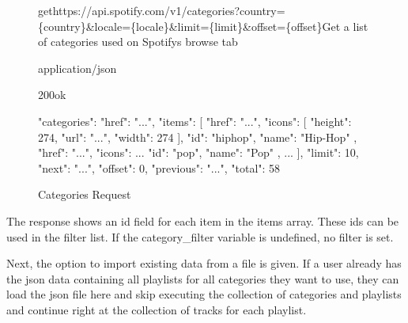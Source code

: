 \begin{figure}[H]
    \caption{Categories Request}
	\label{fig:Categories Request}
\begin{apiRoute}{get}{https://api.spotify.com/v1/categories?country=\{country\}\&locale=\{locale\}\&limit=\{limit\}\&offset=\{offset\}}{Get a list of categories used on Spotifys browse tab}
    \begin{routeParameter}
    \end{routeParameter}
    \begin{routeResponse}{application/json}
        \begin{routeResponseItem}{200}{ok}
            \begin{routeResponseItemBody}
{
    "categories": {
        "href": "...",
        "items": [
            {
                "href": "...",
                "icons": [
                    {
                        "height": 274,
                        "url": "...",
                        "width": 274
                    }
                ],
                "id": "hiphop",
                "name": "Hip-Hop"
            },
            {
                "href": "...",
                "icons": ...
                "id": "pop",
                "name": "Pop"
            },
            ...
        ],
        "limit": 10,
        "next": "...",
        "offset": 0,
        "previous": "...",
        "total": 58
    }
}
            \end{routeResponseItemBody}
        \end{routeResponseItem}
    \end{routeResponse}
\end{apiRoute}
\end{figure}

The response shows an id field for each item in the items array. These ids can be used in the filter list.
If the category\_filter variable is undefined, no filter is set.

Next, the option to import existing data from a file is given.
If a user already has the json data containing all playlists for all categories they want to use,
they can load the json file here and skip executing the collection of categories and playlists and continue right
at the collection of tracks for each playlist.

